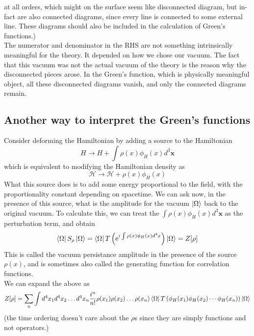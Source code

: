\documentclass[11pt, notitlepage]{report}
\newcommand{\e}{\mathrm{e}}
\newcommand{\hd}{\mathcal{H}}
\numberwithin{equation}{section}
\begin{document}
at all orders, which might on the surface seem like disconnected diagram, but in-fact are also connected diagrams, since every line is connected to some external line. These diagrams should also be included in the calculation of Green's functions.)\\

The numerator and denominator in the RHS are not something intrinsically meaningful for the theory. It depended on how we chose our vacuum. The fact that this vacuum was not the actual vacuum of the theory is the reason why the disconnected pieces arose. In the Green's function, which is physically meaningful object, all these disconnected diagrams vanish, and only the connected diagrams remain.

\subsection{Another way to interpret the Green's functions}
Consider deforming the Hamiltonian by adding a source to the Hamiltonian 
\begin{equation*}
    H \to H + \int \rho(x) \phi_H(x) d^3\textbf{x}
\end{equation*}
which is equivalent to modifying the Hamiltonian density as 
\begin{equation*}
    \hd \to \hd + \rho(x) \phi_H(x)
\end{equation*}
What this source does is to add some energy proportional to the field, with the proportionality constant depending on spacetime. We can ask now, in the presence of this source, what is the amplitude for the vacuum \(\ket{\Omega}\) back to the original vacuum. To calculate this, we can treat the \(\int \rho(x)\phi_H(x)d^3\textbf{x}\) as the perturbation term, and obtain 
\begin{equation*}
    \bra{\Omega}S_\rho \ket{\Omega} = \bra{\Omega} T\left(\e^{i\int \rho(x)\phi_H(x)d^4x} \right) \ket{\Omega}  = Z[\rho]
\end{equation*}
This is called the vacuum persistance amplitude in the presence of the source \(\rho(x)\), and is sometimes also called the generating function for correlation functions.\\
We can expand the above as 
\begin{equation*}
    Z[\rho] = \sum_n \int d^4x_1 d^4x_2 \ldots d^4x_n \frac{i^n}{n!} \rho(x_1)\rho(x_2)\ldots\rho(x_n)\bra{\Omega} T\left(  \phi_H(x_1)\phi_H(x_2)\cdots \phi_H(x_n) \right) \ket{\Omega}
\end{equation*}
(the time ordering doesn't care about the \(\rho\)s since they are simply functions and not operators.)\\
\end{document}

